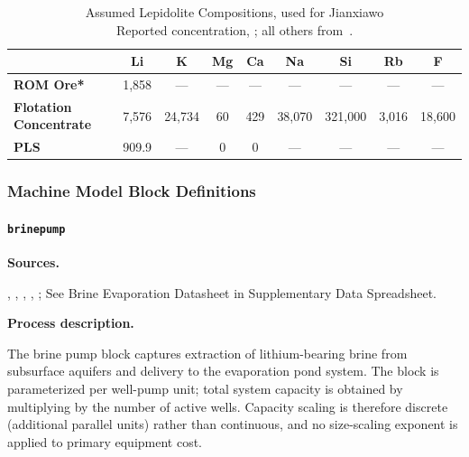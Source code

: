 \documentclass{article}
\renewcommand\_{\textunderscore\allowbreak}
\begin{document}
\begin{table}[h]
\centering
\caption[Assumed Lepidolite Compositions]{Assumed Lepidolite Compositions, used for Jianxiawo \\
\small *Reported concentration, \citet{zhangChinaHasDomestic2025}; all others from~\cite{garrettHandbookLithiumNatural2004}.}
\label{tab:c-lepidolite-compositions}
\begin{tabular}{|l|c|c|c|c|c|c|c|c|}
\hline
 & \textbf{Li} & \textbf{K} & \textbf{Mg} & \textbf{Ca} & \textbf{Na} & \textbf{Si} & \textbf{Rb} & \textbf{F} \\
\hline
\textbf{ROM Ore*}        & 1,858  & ---    & ---  & ---  & ---    & ---     & ---    & ---    \\
\hline
\textbf{Flotation Concentrate} & 7,576 & 24,734 & 60   & 429  & 38,070 & 321,000 & 3,016  & 18,600 \\
\hline
\textbf{PLS}             & 909.9 & --- & 0    & 0    & ---  & --- & --- & --- \\
\hline
\end{tabular}
\end{table}




\clearpage
\subsubsection{Machine Model Block Definitions}\label{app:04-methods-blockdefs}


\paragraph{\texttt{brine\_pump}}\label{app:04-methods-blockdefs-brinepump}\leavevmode\par

\medskip
\noindent\textbf{Sources.}\quad

\citet{srkconsultingSECTechnicalReport2023a}, \citet{becerraTechnicalReportSummary2024}, \citet{srkconsultingSECTechnicalReport2022}, \citet{montgomeryassociatesconsultoreslimitadaSECTechnicalReport2023}, \citet{brookerSECTechnicalReport2023};
See Brine Evaporation Datasheet in Supplementary Data Spreadsheet. 

\medskip
\noindent\textbf{Process description.}\quad

The brine pump block captures extraction of lithium-bearing brine from subsurface aquifers and delivery to the evaporation pond system. The block is parameterized per well-pump unit; total system capacity is obtained by multiplying by the number of active wells. Capacity scaling is therefore discrete (additional parallel units) rather than continuous, and no size-scaling exponent is applied to primary equipment cost.
\end{document}
